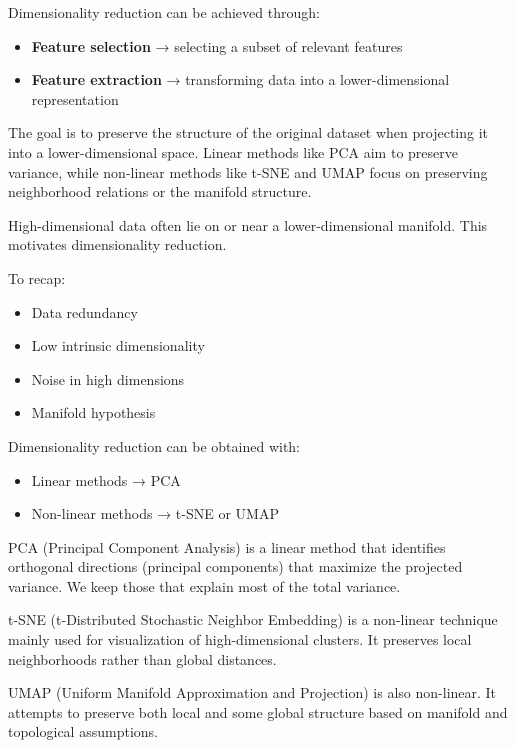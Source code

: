 Dimensionality reduction can be achieved through:

\begin{itemize}
    \item \textbf{Feature selection} → selecting a subset of relevant features
    \item \textbf{Feature extraction} → transforming data into a lower-dimensional representation
\end{itemize}

The goal is to preserve the structure of the original dataset when projecting it into a lower-dimensional space. Linear methods like PCA aim to preserve variance, while non-linear methods like t-SNE and UMAP focus on preserving neighborhood relations or the manifold structure.

High-dimensional data often lie on or near a lower-dimensional manifold. This motivates dimensionality reduction.

\vspace{10pt}

To recap:

\begin{itemize}
    \item Data redundancy
    \item Low intrinsic dimensionality
    \item Noise in high dimensions
    \item Manifold hypothesis
\end{itemize}

Dimensionality reduction can be obtained with:

\begin{itemize}
    \item Linear methods → PCA
    \item Non-linear methods → t-SNE or UMAP
\end{itemize}

PCA (Principal Component Analysis) is a linear method that identifies orthogonal directions (principal components) that maximize the projected variance. We keep those that explain most of the total variance.

t-SNE (t-Distributed Stochastic Neighbor Embedding) is a non-linear technique mainly used for visualization of high-dimensional clusters. It preserves local neighborhoods rather than global distances.

UMAP (Uniform Manifold Approximation and Projection) is also non-linear. It attempts to preserve both local and some global structure based on manifold and topological assumptions.

